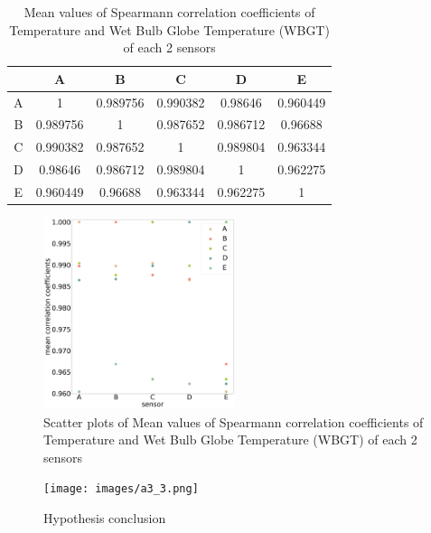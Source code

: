 \documentclass[a4paper]{article}
\begin{document}
\begin{table}[htbp]
  \centering
  \caption{Mean values of Spearmann correlation coefficients of Temperature and Wet Bulb Globe Temperature (WBGT) of each 2 sensors}
    \begin{tabular}{c|ccccc}
          & A     & B     & C     & D     & E \\
    \midrule
    A     & 1     & 0.989756 & 0.990382 & 0.98646 & 0.960449 \\
    B     & 0.989756 & 1     & 0.987652 & 0.986712 & 0.96688 \\
    C     & 0.990382 & 0.987652 & 1     & 0.989804 & 0.963344 \\
    D     & 0.98646 & 0.986712 & 0.989804 & 1     & 0.962275 \\
    E     & 0.960449 & 0.96688 & 0.963344 & 0.962275 & 1 \\
    \end{tabular}%
\end{table}%

\begin{figure}[htbp]
\centering
\includegraphics[width=0.5\textwidth]{images/sensors_location.png} 
\caption{Scatter plots of Mean values of Spearmann correlation coefficients of Temperature and Wet Bulb Globe Temperature (WBGT) of each 2 sensors}
\end{figure}

\begin{figure}[htbp]
\centering
\texttt{[image: images/a3\_3.png]} 
\caption{Hypothesis conclusion}
\end{figure}
\end{document}

